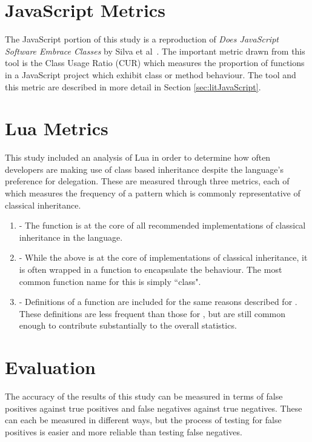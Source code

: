\section{JavaScript Metrics}
The JavaScript portion of this study is a reproduction of \textit{Does JavaScript Software Embrace Classes} by Silva et al~\cite{JSClassFinder}. The important metric drawn from this tool is the Class Usage Ratio (CUR) which measures the proportion of functions in a JavaScript project which exhibit class or method behaviour. The tool and this metric are described in more detail in Section \ref{sec:litJavaScript}.

\section{Lua Metrics}
This study included an analysis of Lua in order to determine how often developers are making use of class based inheritance despite the language's preference for delegation. These are measured through three metrics, each of which measures the frequency of a pattern which is commonly representative of classical inheritance.
\begin{enumerate}
	\item {} - The  function is at the core of all recommended implementations of classical inheritance in the language.
	\item {} - While the  above is at the core of implementations of classical inheritance, it is often wrapped in a function to encapsulate the behaviour. The most common function name for this is simply ``class".
	\item {} - Definitions of a  function are included for the same reasons described for . These definitions are less frequent than those for , but are still common enough to contribute substantially to the overall statistics.
\end{enumerate}

\section{Evaluation}
The accuracy of the results of this study can be measured in terms of false positives against true positives and false negatives against true negatives. These can each be measured in different ways, but the process of testing for false positives is easier and more reliable than testing false negatives.

